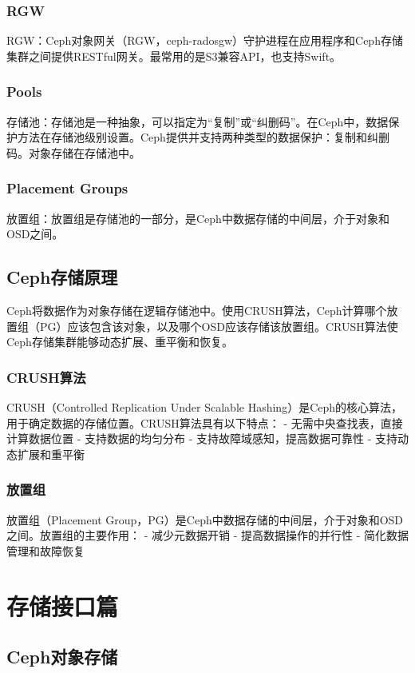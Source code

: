 \documentclass[12pt,UTF8]{ctexbook}
\begin{document}
\subsection{RGW}
RGW：Ceph对象网关（RGW，ceph-radosgw）守护进程在应用程序和Ceph存储集群之间提供RESTful网关。最常用的是S3兼容API，也支持Swift。

\subsection{Pools}
存储池：存储池是一种抽象，可以指定为“复制”或“纠删码”。在Ceph中，数据保护方法在存储池级别设置。Ceph提供并支持两种类型的数据保护：复制和纠删码。对象存储在存储池中。

\subsection{Placement Groups}
放置组：放置组是存储池的一部分，是Ceph中数据存储的中间层，介于对象和OSD之间。

\section{Ceph存储原理}

Ceph将数据作为对象存储在逻辑存储池中。使用CRUSH算法，Ceph计算哪个放置组（PG）应该包含该对象，以及哪个OSD应该存储该放置组。CRUSH算法使Ceph存储集群能够动态扩展、重平衡和恢复。

\subsection{CRUSH算法}
CRUSH（Controlled Replication Under Scalable Hashing）是Ceph的核心算法，用于确定数据的存储位置。CRUSH算法具有以下特点：
- 无需中央查找表，直接计算数据位置
- 支持数据的均匀分布
- 支持故障域感知，提高数据可靠性
- 支持动态扩展和重平衡

\subsection{放置组}
放置组（Placement Group，PG）是Ceph中数据存储的中间层，介于对象和OSD之间。放置组的主要作用：
- 减少元数据开销
- 提高数据操作的并行性
- 简化数据管理和故障恢复

\chapter{存储接口篇}
\section{Ceph对象存储}
\end{document}
